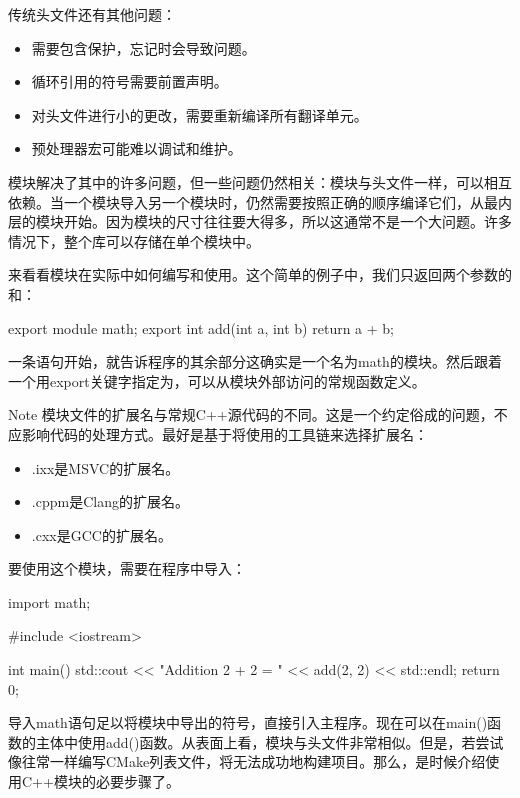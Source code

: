 传统头文件还有其他问题：

\begin{itemize}
\item
需要包含保护，忘记时会导致问题。

\item
循环引用的符号需要前置声明。

\item
对头文件进行小的更改，需要重新编译所有翻译单元。

\item
预处理器宏可能难以调试和维护。
\end{itemize}

模块解决了其中的许多问题，但一些问题仍然相关：模块与头文件一样，可以相互依赖。当一个模块导入另一个模块时，仍然需要按照正确的顺序编译它们，从最内层的模块开始。因为模块的尺寸往往要大得多，所以这通常不是一个大问题。许多情况下，整个库可以存储在单个模块中。

来看看模块在实际中如何编写和使用。这个简单的例子中，我们只返回两个参数的和：


\begin{cpp}
export module math;
export int add(int a, int b) {
    return a + b;
}
\end{cpp}

一条语句开始，就告诉程序的其余部分这确实是一个名为math的模块。然后跟着一个用export关键字指定为，可以从模块外部访问的常规函数定义。

\begin{myNotic}{Note}
模块文件的扩展名与常规C++源代码的不同。这是一个约定俗成的问题，不应影响代码的处理方式。最好是基于将使用的工具链来选择扩展名：

\begin{itemize}
\item
.ixx是MSVC的扩展名。

\item
.cppm是Clang的扩展名。

\item
.cxx是GCC的扩展名。
\end{itemize}
\end{myNotic}

要使用这个模块，需要在程序中导入：


\begin{cpp}
import math;

#include <iostream>

int main() {
    std::cout << "Addition 2 + 2 = " << add(2, 2) << std::endl;
    return 0;
}
\end{cpp}

导入math语句足以将模块中导出的符号，直接引入主程序。现在可以在main()函数的主体中使用add()函数。从表面上看，模块与头文件非常相似。但是，若尝试像往常一样编写CMake列表文件，将无法成功地构建项目。那么，是时候介绍使用C++模块的必要步骤了。









